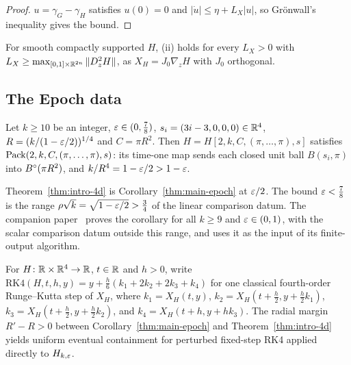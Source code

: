 \begin{proof}
$u=\gamma_G-\gamma_H$ satisfies $u(0)=0$ and $|\dot u|\le\eta+L_X|u|$, so Gr\"onwall's inequality gives the bound.
\end{proof}

For smooth compactly supported $H$, (ii) holds for every $L_X>0$ with $L_X\ge\max_{[0,1]\times\mathbb{R}^{2n}}\|D^2_zH\|$, as
$X_H=J_0\nabla_zH$ with $J_0$ orthogonal.

\subsection{The Epoch data}\label{sec:results-epoch}

\begin{maincorollary}\label{thm:main-epoch}
Let $k\ge10$ be an integer, $\varepsilon\in(0,\frac78)$, $s_i=(3i-3,0,0,0)\in\mathbb{R}^4$, $R=(k/(1-\varepsilon/2))^{1/4}$ and $C=\pi R^2$.
Then $H=H[2,k,C,(\pi,\dots,\pi),s]$ satisfies $\mathrm{Pack}(2,k,C,(\pi,\dots,\pi),s)$: its time-one map sends each closed unit
ball $B(s_i,\pi)$ into $B^{\circ}(\pi R^2)$, and $k/R^4=1-\varepsilon/2>1-\varepsilon$.
\end{maincorollary}

Theorem~\ref{thm:intro-4d} is Corollary~\ref{thm:main-epoch} at $\varepsilon/2$. The bound $\varepsilon<\frac78$ is the range
$\rho\sqrt k=\sqrt{1-\varepsilon/2}>\frac34$ of the linear comparison datum. The companion paper~\cite{SongHD} proves the
corollary for all $k\ge9$ and $\varepsilon\in(0,1)$, with the scalar comparison datum outside this range, and uses it as the
input of its finite-output algorithm.

For $H\colon\mathbb{R}\times\mathbb{R}^4\to\mathbb{R}$, $t\in\mathbb{R}$ and $h>0$, write $\mathrm{RK4}(H,t,h,y)=y+\frac h6(k_1+2k_2+2k_3+k_4)$ for
one classical fourth-order Runge--Kutta step of $X_H$, where $k_1=X_H(t,y)$, $k_2=X_H(t+\frac h2,y+\frac h2k_1)$,
$k_3=X_H(t+\frac h2,y+\frac h2k_2)$, and $k_4=X_H(t+h,y+hk_3)$. The radial margin $R'-R>0$ between
Corollary~\ref{thm:main-epoch} and Theorem~\ref{thm:intro-4d} yields uniform eventual containment for perturbed
fixed-step RK4 applied directly to $H_{k,\varepsilon}$.

